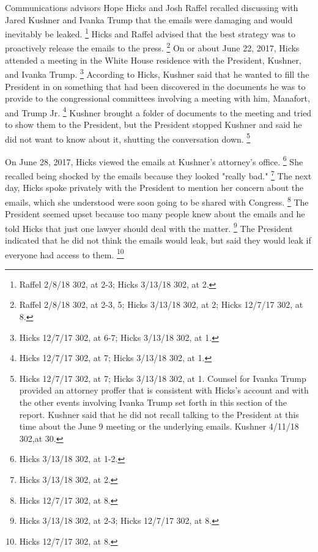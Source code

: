 Communications advisors Hope Hicks and Josh Raffel recalled discussing with Jared Kushner and Ivanka Trump that the emails were damaging and would inevitably be leaked.%
\footnote{Raffel 2/8/18 302, at 2-3;
Hicks 3/13/18 302, at 2.}
Hicks and Raffel advised that the best strategy was to proactively release the emails to the press.%
\footnote{Raffel 2/8/18 302, at 2-3, 5;
Hicks 3/13/18 302, at 2;
Hicks 12/7/17 302, at 8.}
On or about June 22, 2017, Hicks attended a meeting in the White House residence with the President, Kushner, and Ivanka Trump.%
\footnote{Hicks 12/7/17 302, at 6-7;
Hicks 3/13/18 302, at 1.}
According to Hicks, Kushner said that he wanted to fill the President in on something that had been discovered in the documents he was to provide to the congressional committees involving a meeting with him, Manafort, and Trump Jr.%
\footnote{Hicks 12/7/17 302, at 7;
Hicks 3/13/18 302, at 1.}
Kushner brought a folder of documents to the meeting and tried to show them to the President, but the President stopped Kushner and said he did not want to know about it, shutting the conversation down.%
\footnote{Hicks 12/7/17 302, at 7;
Hicks 3/13/18 302, at 1.
Counsel for Ivanka Trump provided an attorney proffer that is consistent with Hicks’s account and with the other events involving Ivanka Trump set forth in this section of the report.
Kushner said that he did not recall talking to the President at this time about the June 9 meeting or the underlying emails.
Kushner 4/11/18 302,at 30.}

On June 28, 2017, Hicks viewed the emails at Kushner's attorney's office.%
\footnote{Hicks 3/13/18 302, at 1-2.}
She recalled being shocked by the emails because they looked "really bad."%
\footnote{Hicks 3/13/18 302, at 2.}
The next day, Hicks spoke privately with the President to mention her concern about the emails, which she understood were soon going to be shared with Congress.%
\footnote{Hicks 12/7/17 302, at 8.}
The President seemed upset because too many people knew about the emails and he told Hicks that just one lawyer should deal with the matter.%
\footnote{Hicks 3/13/18 302, at 2-3;
Hicks 12/7/17 302, at 8.}
The President indicated that he did not think the emails would leak, but said they would leak if everyone had access to them.%
\footnote{Hicks 12/7/17 302, at 8.}

